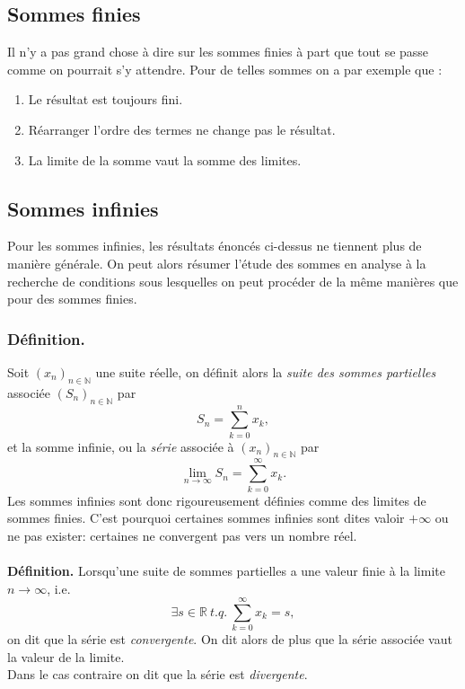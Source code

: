 \documentclass[oneside,11pt,french,table]{book}
\theoremstyle{definition}
\theoremstyle{plain}
\theoremstyle{remark}
\begin{document}
    \subsection{Sommes finies}
        Il n'y a pas grand chose à dire sur les sommes finies à part que tout se passe comme on pourrait s'y attendre. Pour de telles sommes on a par exemple que  :
        \begin{center}
            \begin{minipage}{0.65\textwidth}
            \begin{enumerate}
                \item Le résultat est toujours fini.
                \item Réarranger l'ordre des termes ne change pas le résultat.
                \item La limite de la somme vaut la somme des limites.
            \end{enumerate}
            \end{minipage}
        \end{center}
    \subsection{Sommes infinies}
        Pour les sommes infinies, les résultats énoncés ci-dessus ne tiennent plus de manière générale. On peut alors résumer l'étude des sommes en analyse à la recherche de conditions sous lesquelles on peut procéder de la même manières que pour des sommes finies.
        
    \subsubsection{Définition.}
        Soit $(x_n)_{n\in\mathbb{N}}$ une suite réelle, on définit alors la \textit{suite des sommes partielles} associée $(S_n)_{n\in\mathbb{N}}$ par 
        \[
            S_n=\sum_{k=0}^{n}x_k,
        \]
        et la somme infinie, ou la \textit{série} associée à $(x_n)_{n\in\mathbb{N}}$ par 
        \[
            \lim_{n\to\infty}S_n=\sum_{k=0}^{\infty}x_k.
        \]
Les sommes infinies sont donc rigoureusement définies comme des limites de sommes finies. C'est pourquoi certaines sommes infinies sont dites valoir $+ \infty$ ou ne pas exister: certaines ne convergent pas vers un nombre réel. \\ \\
\textbf{Définition.}
        Lorsqu'une suite de sommes partielles a une valeur finie à la limite $n\to\infty$, i.e.
        \[
            \exists s\in\mathbb{R}\ t.q. \ \sum_{k=0}^{\infty}x_k=s,
        \]
         on dit que la série est \textit{convergente}. On dit alors de plus que la série associée vaut la valeur de la limite. \\
        Dans le cas contraire on dit que la série est \textit{divergente}.
\end{document}
